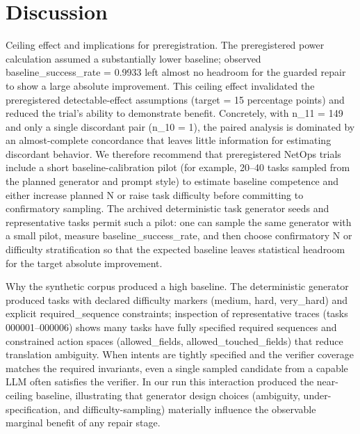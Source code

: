 \documentclass[conference]{IEEEtran}
\begin{document}
\section{Discussion}
Ceiling effect and implications for preregistration. The preregistered power calculation assumed a substantially lower baseline; observed baseline\_success\_rate = 0.9933 left almost no headroom for the guarded repair to show a large absolute improvement. This ceiling effect invalidated the preregistered detectable-effect assumptions (target = 15 percentage points) and reduced the trial's ability to demonstrate benefit. Concretely, with n\_11 = 149 and only a single discordant pair (n\_10 = 1), the paired analysis is dominated by an almost-complete concordance that leaves little information for estimating discordant behavior. We therefore recommend that preregistered NetOps trials include a short baseline-calibration pilot (for example, 20--40 tasks sampled from the planned generator and prompt style) to estimate baseline competence and either increase planned N or raise task difficulty before committing to confirmatory sampling. The archived deterministic task generator seeds and representative tasks permit such a pilot: one can sample the same generator with a small pilot, measure baseline\_success\_rate, and then choose confirmatory N or difficulty stratification so that the expected baseline leaves statistical headroom for the target absolute improvement.

Why the synthetic corpus produced a high baseline. The deterministic generator produced tasks with declared difficulty markers (medium, hard, very\_hard) and explicit required\_sequence constraints; inspection of representative traces (tasks 000001--000006) shows many tasks have fully specified required sequences and constrained action spaces (allowed\_fields, allowed\_touched\_fields) that reduce translation ambiguity. When intents are tightly specified and the verifier coverage matches the required invariants, even a single sampled candidate from a capable LLM often satisfies the verifier. In our run this interaction produced the near-ceiling baseline, illustrating that generator design choices (ambiguity, under-specification, and difficulty-sampling) materially influence the observable marginal benefit of any repair stage.
\end{document}

